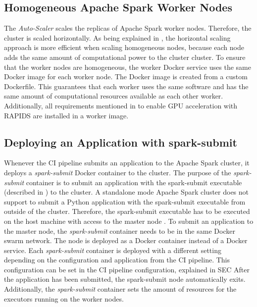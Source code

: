 \subsection{Homogeneous Apache Spark Worker Nodes}
The \textit{Auto-Scaler} scales the replicas of Apache Spark worker nodes. Therefore, the cluster is scaled horizontally. As being explained in , the horizontal scaling approach is more efficient when scaling homogeneous nodes, because each node adds the same amount of computational power to the cluster cluster.
To ensure that the worker nodes are homogeneous, the worker Docker service uses the same Docker image for each worker node. The Docker image is created from a custom Dockerfile.
This guarantees that each worker uses the same software and has the same amount of computational resources available as each other worker.
Additionally, all requirements mentioned in  to enable GPU acceleration with RAPIDS are installed in a worker image.


\subsection{Deploying an Application with spark-submit}
\label{subsec:05_spark_spark-submit}
Whenever the CI pipeline submits an application to the Apache Spark cluster, it deploys a \textit{spark-submit} Docker container to the cluster.
The purpose of the \textit{spark-submit} container is to submit an application with the spark-submit executable (described in ) to the cluster.
A standalone mode Apache Spark cluster does not support to submit a Python application with the spark-submit executable from outside of the cluster. Therefore, the spark-submit executable has to be executed on the host machine with access to the master node \cite{Apache2020Spark}.
To submit an application to the master node, the \textit{spark-submit} container needs to be in the same Docker swarm network. The node is deployed as a Docker container instead of a Docker service. Each \textit{spark-submit} container is deployed with a different setting depending on the configuration and application from the CI pipeline. This configuration can be set in the CI pipeline configuration, explained in SEC
After the application has been submitted, the spark-submit node automatically exits.
Additionally, the \textit{spark-submit} container sets the amount of resources for the executors running on the worker nodes.


